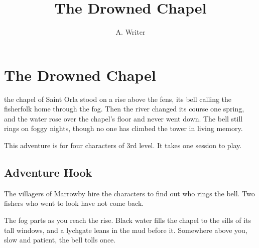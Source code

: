 \documentclass[letterpaper,twoside,twocolumn,openany,nodeprecatedcode,
  fonts=solbera,srd=5.1]{dndbook}
\title{The Drowned Chapel}
\author{A. Writer}
\begin{document}

\frontmatter


\tableofcontents

\mainmatter

\chapter{The Drowned Chapel}

 the chapel of Saint Orla stood on a rise above the fens, its bell calling the fisherfolk home through the fog. Then the river changed its course one spring, and the water rose over the chapel's floor and never went down. The bell still rings on foggy nights, though no one has climbed the tower in living memory.

This adventure is for four characters of 3rd level. It takes one session to play.

\section{Adventure Hook}

The villagers of Marrowby hire the characters to find out who rings the bell. Two fishers who went to look have not come back.

\begin{DndReadAloud}
  The fog parts as you reach the rise. Black water fills the chapel to the sills of its tall windows, and a lychgate leans in the mud before it. Somewhere above you, slow and patient, the bell tolls once.
\end{DndReadAloud}
\end{document}
